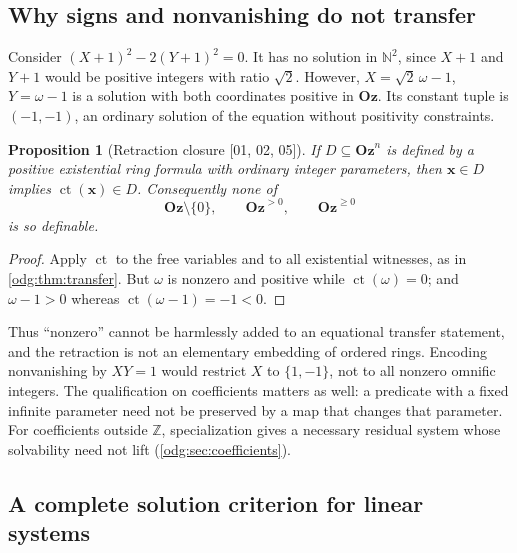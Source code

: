 \documentclass[11pt,oneside]{article}
\numberwithin{equation}{section}
\newtheorem{proposition}[proposition]{Proposition}
\theoremstyle{definition}
\theoremstyle{remark}
\newcommand{\Oz}{\mathbf{Oz}}
\newcommand{\Z}{\mathbb Z}
\newcommand{\N}{\mathbb N}
\newcommand{\ct}{\operatorname{ct}}
\newcommand{\src}[1]{\textup{\textsf{\small[#1]}}}
\begin{document}
\subsection{Why signs and nonvanishing do not transfer}

Consider $(X+1)^2-2(Y+1)^2=0$. It has no solution in $\N^2$, since $X+1$
and $Y+1$ would be positive integers with ratio $\sqrt2$. However,
$X=\sqrt2\,\omega-1$, $Y=\omega-1$ is a solution with both coordinates
positive in $\Oz$. Its constant tuple is $(-1,-1)$, an ordinary solution of
the equation without positivity constraints.

\begin{proposition}[Retraction closure \src{01, 02, 05}]\label{odg:prop:notdiophantine}
If $D\subseteq\Oz^n$ is defined by a positive existential ring formula with
ordinary integer parameters, then $\mathbf x\in D$ implies
$\ct(\mathbf x)\in D$. Consequently none of
\[
 \Oz\setminus\{0\},\qquad \Oz^{>0},\qquad \Oz^{\geq0}
\]
is so definable.
\end{proposition}
\begin{proof}
Apply $\ct$ to the free variables and to all existential witnesses, as in
\cref{odg:thm:transfer}. But $\omega$ is nonzero and positive while
$\ct(\omega)=0$; and $\omega-1>0$ whereas $\ct(\omega-1)=-1<0$.
\end{proof}

Thus ``nonzero'' cannot be harmlessly added to an equational transfer
statement, and the retraction is not an elementary embedding of ordered
rings. Encoding nonvanishing by $XY=1$ would restrict $X$ to $\{1,-1\}$,
not to all nonzero omnific integers. The qualification on coefficients
matters as well: a predicate with a fixed infinite parameter need not be
preserved by a map that changes that parameter. For coefficients outside
$\Z$, specialization gives a necessary residual system whose solvability need
not lift (\cref{odg:sec:coefficients}).

\subsection{A complete solution criterion for linear systems}
\end{document}
